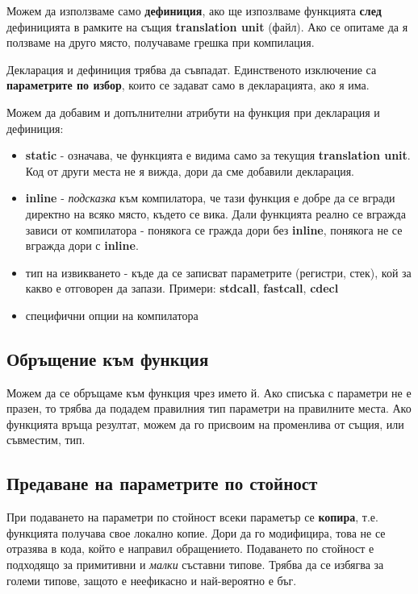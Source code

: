 \documentclass[fleqn,12pt]{article}
\begin{document}
Можем да използваме само \textbf{дефиниция}, ако ще изпозлваме функцията \textbf{след} дефиницията в рамките на същия \textbf{translation unit} (файл).
Ако се опитаме да я ползваме на друго място, получаваме грешка при компилация.

Декларация и дефиниция трябва да съвпадат. Единственото изключение са \textbf{параметрите по избор}, които се задават само 
в декларацията, ако я има.

Можем да добавим и допълнителни атрибути на функция при декларация и дефиниция:
\begin{itemize}
    \item \textbf{static} - означава, че функцията е видима само за текущия \textbf{translation unit}. Код от други места не я вижда, дори да сме добавили декларация.
    \item \textbf{inline} - \textit{подсказка} към компилатора, че тази функция е добре да се вгради директно на всяко място, където се вика. Дали 
    функцията реално се вгражда зависи от компилатора - понякога се гражда дори без \textbf{inline}, понякога не се вгражда дори с \textbf{inline}.
    \item тип на извикването - къде да се записват параметрите (регистри, стек), кой за какво е отговорен да запази. Примери: \textbf{stdcall}, \textbf{fastcall}, \textbf{cdecl}
    \item специфични опции на компилатора
\end{itemize}

\subsection{Обръщение към функция}
Можем да се обръщаме към функция чрез името й. Ако списъка с параметри не е празен, то трябва да подадем правилния тип параметри на правилните места.
Ако функцията връща резултат, можем да го присвоим на променлива от същия, или съвместим, тип.

\subsection{Предаване на параметрите по стойност}
При подаването на параметри по стойност всеки параметър се \textbf{копира}, т.е. функцията получава свое локално копие. 
Дори да го модифицира, това не се отразява в кода, който е направил обращението. Подаването по стойност е подходящо за примитивни и 
\textit{малки} съставни типове. Трябва да се избягва за големи типове, защото е неефикасно и най-вероятно е бъг.
\end{document}

